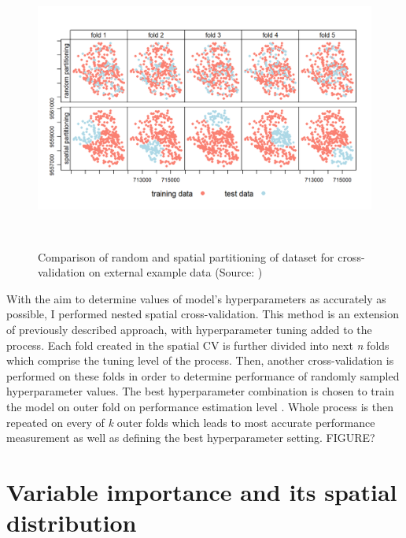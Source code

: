 \documentclass{amuthesis}
\begin{document}
\begin{figure}[t]

{\centering \includegraphics[width=5.9375in,height=3.64583in]{./figures/spatial_partitioning.png}

}

\caption{\label{fig-rycina5}Comparison of random and spatial
partitioning of dataset for cross-validation on external example data
(Source: \textcite{lovelace_geocomputation_2019})}

\end{figure}

With the aim to determine values of model's hyperparameters as
accurately as possible, I performed nested spatial cross-validation.
This method is an extension of previously described approach, with
hyperparameter tuning added to the process. Each fold created in the
spatial CV is further divided into next \emph{n} folds which comprise
the tuning level of the process. Then, another cross-validation is
performed on these folds in order to determine performance of randomly
sampled hyperparameter values. The best hyperparameter combination is
chosen to train the model on outer fold on performance estimation level
\autocite{schratz_hyperparameter_2019}. Whole process is then repeated
on every of \emph{k} outer folds which leads to most accurate
performance measurement as well as defining the best hyperparameter
setting. FIGURE?

\hypertarget{sec-importance}{%
\section{Variable importance and its spatial
distribution}\label{sec-importance}}
\end{document}
